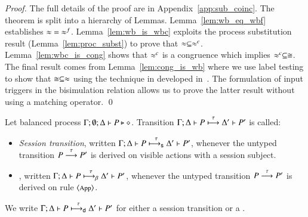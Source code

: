 \begin{proof}
	The full details of the proof are in Appendix~\ref{app:sub_coinc}.
	The theorem is split into a hierarchy of Lemmas. 
	Lemma~\ref{lem:wb_eq_wbf} establishes $\approx\ =\ \approx^{f}$.
	Lemma~\ref{lem:wb_is_wbc} exploits the process substitution result
	(Lemma~\ref{lem:proc_subst}) to prove that $\approx \subseteq \approx^{c}$.
	Lemma~\ref{lem:wbc_is_cong} shows that $\approx^{c}$ is a congruence
	which implies $\approx^{c} \subseteq \cong$.
	The final result comes from Lemma~\ref{lem:cong_is_wb} where
	we use label testing to show that $\cong \subseteq \approx$ using
	the technique in developed in~\cite{Hennessy07}. The formulation of input
	triggers in the bisimulation relation allows us to prove
	the latter result without using a matching operator.
	\qed
\end{proof}

%

\begin{definition}\rm
	Let balanced \HOp process $\Gamma; \emptyset; \Delta \vdash P \triangleright \diamond$.
	Transition $\Gamma; \Delta \vdash P \stackrel{\tau}{\longmapsto} \Delta' \vdash P'$ is called:
	\begin{itemize}
		\item	{\em Session transition}, written
			$\Gamma; \Delta \vdash P \stackrel{\tau}{\longmapsto_{\mathsf{s}}} \Delta' \vdash P'$,
			whenever the untyped transition $P \stackrel{\tau}{\longrightarrow} P'$
			is derived on visible actions with a session subject.

		\item	{\em \betatran}, written
			$\Gamma; \Delta \vdash P \stackrel{\tau}{\longmapsto_{\mathsf{\beta}}} \Delta' \vdash P'$,
			whenever the untyped transition $P \stackrel{\tau}{\longrightarrow} P'$
			is derived on rule ${\footnotesize \langle \textrm{App} \rangle}$.
	\end{itemize}
%
	We write $\Gamma; \Delta \vdash P \stackrel{\tau}{\longmapsto_{\mathsf{d}}} \Delta' \vdash P'$ for
	either a session transition or a \betatran.
\end{definition}

